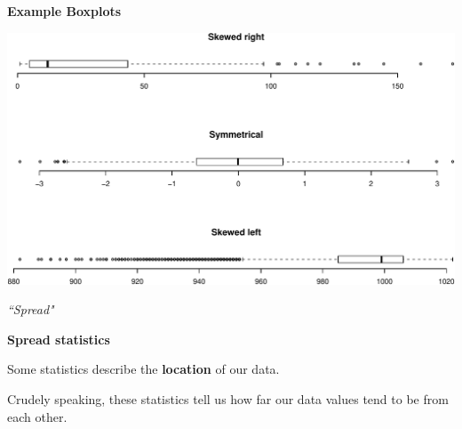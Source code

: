 \documentclass[ignorenonframetext,]{beamer}
\begin{document}
\begin{frame}{}
\protect\hypertarget{section-41}{}

\textbf{\large Example Boxplots}

\vspace{1ex}\scriptsize

\includegraphics{lecture-03_files/figure-beamer/unnamed-chunk-23-1.pdf}

\end{frame}

\begin{frame}[standout]{}
\protect\hypertarget{section-42}{}

\begin{center}
    \vspace{2.3em}
    \color{white}\textit{\Huge\gar ``Spread"}
\end{center}

\end{frame}

\begin{frame}{}
\protect\hypertarget{section-43}{}

\textbf{\large Spread statistics}

\vspace{2ex}

Some statistics describe the \textbf{location} of our data.

\vspace{2ex}

Crudely speaking, these statistics tell us how far our data values tend
to be from each other.

\end{frame}
\end{document}
